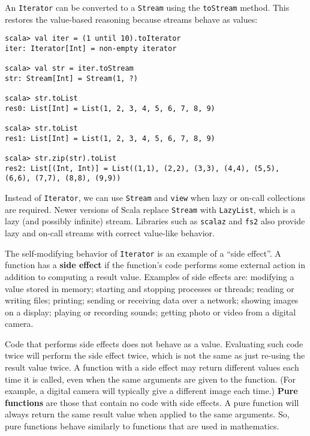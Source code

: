 An \lstinline!Iterator! can be converted to a \lstinline!Stream!
using the \lstinline!toStream! method. This restores the value-based
reasoning because streams behave as values:
\begin{lstlisting}
scala> val iter = (1 until 10).toIterator
iter: Iterator[Int] = non-empty iterator

scala> val str = iter.toStream
str: Stream[Int] = Stream(1, ?)

scala> str.toList
res0: List[Int] = List(1, 2, 3, 4, 5, 6, 7, 8, 9)

scala> str.toList
res1: List[Int] = List(1, 2, 3, 4, 5, 6, 7, 8, 9)

scala> str.zip(str).toList
res2: List[(Int, Int)] = List((1,1), (2,2), (3,3), (4,4), (5,5), (6,6), (7,7), (8,8), (9,9)) 
\end{lstlisting}

Instead of \lstinline!Iterator!, we can use \lstinline!Stream! and
\lstinline!view! when lazy or on-call collections are required. Newer
versions of Scala replace \lstinline!Stream! with \lstinline!LazyList!,
which is a lazy (and possibly infinite) stream. Libraries such as
\lstinline!scalaz! and \lstinline!fs2! also provide lazy and on-call
streams with correct value-like behavior.

The self-modifying behavior of \lstinline!Iterator! is an example
of a \textsf{``}side effect\textsf{''}. A function has a \textbf{side
effect} if the function\textsf{'}s code performs some external action in addition
to computing a result value. Examples of side effects are: modifying
a value stored in memory; starting and stopping processes or threads;
reading or writing files; printing; sending or receiving data over
a network; showing images on a display; playing or recording sounds;
getting photo or video from a digital camera. 

Code that performs side effects does not behave as a value. Evaluating
such code twice will perform the side effect twice, which is not the
same as just re-using the result value twice. A function with a side
effect may return different values each time it is called, even when
the same arguments are given to the function. (For example, a digital
camera will typically give a different image each time.) \textbf{Pure
functions} are those that contain no code with side effects. A pure
function will always return the same result value when applied to
the same arguments. So, pure functions behave similarly to functions
that are used in mathematics.
